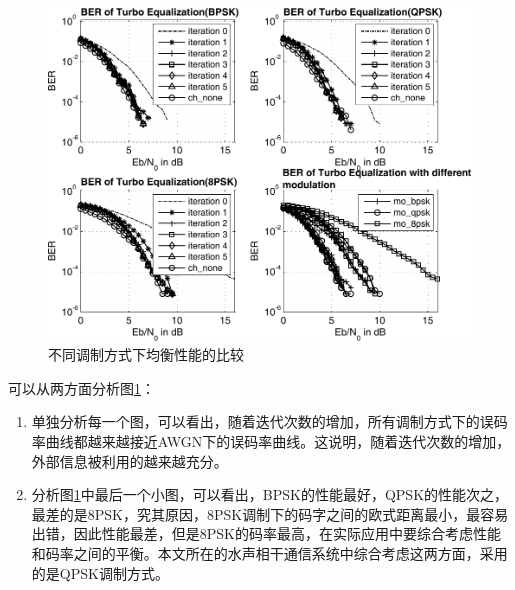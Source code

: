 \begin{figure}[htb]
  \begin{center}
    \includegraphics[width=\textwidth]{images/different_mod_separate.pdf}
  \end{center}
  \caption{不同调制方式下均衡性能的比较}
  \label{fig:3.4}
\end{figure}

可以从两方面分析图\ref{fig:3.4}：
\begin{enumerate}
    \item
        单独分析每一个图，可以看出，随着迭代次数的增加，所有调制方式下的误码率曲线都越来越接近AWGN下的误码率曲线。这说明，随着迭代次数的增加，外部信息被利用的越来越充分。
    \item
        分析图\ref{fig:3.4}中最后一个小图，可以看出，BPSK的性能最好，QPSK的性能次之，最差的是8PSK，究其原因，8PSK调制下的码字之间的欧式距离最小，最容易出错，因此性能最差，但是8PSK的码率最高，在实际应用中要综合考虑性能和码率之间的平衡。本文所在的水声相干通信系统中综合考虑这两方面，采用的是QPSK调制方式。
\end{enumerate}

